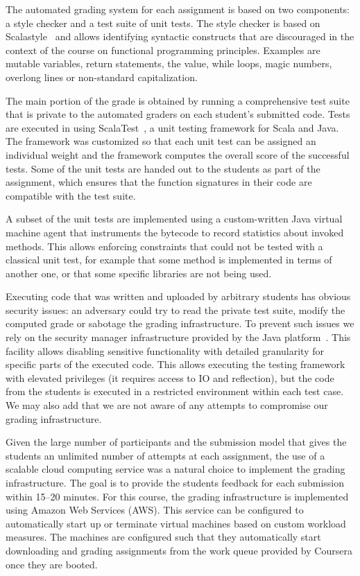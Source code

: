 \documentclass{sig-alternate}
\begin{document}
The automated grading system for each assignment is based on two components: a
style checker and a test suite of unit tests. The style checker is based on
Scalastyle~\cite{ScalaStyle} and allows identifying syntactic constructs that
are discouraged in the context of the course on functional programming principles.
Examples are mutable variables, return statements, the \lstinline@null@ value,
while loops, magic numbers, overlong lines or non-standard capitalization.

The main portion of the grade is obtained by running a comprehensive test suite
that is private to the automated graders on each student's submitted code.
Tests are executed in using ScalaTest~\cite{scalatest}, a unit testing framework
for Scala and Java. The framework was customized so that each unit test can be
assigned an individual weight and the framework computes the overall score of
the successful tests. Some of the unit tests are handed out to the students as
part of the assignment, which ensures that the function signatures in their code
are compatible with the test suite.

A subset of the unit tests are implemented using a custom-written Java virtual
machine agent \cite{vmagents} that instruments the bytecode to record statistics about
invoked methods. This allows enforcing constraints that could not be tested with a
classical unit test, for example that some method is implemented in terms of another
one, or that some specific libraries are not being used.

Executing code that was written and uploaded by arbitrary students has obvious
security issues: an adversary could try to read the private test suite, modify
the computed grade or sabotage the grading infrastructure. To prevent such issues
we rely on the security manager infrastructure provided by the Java platform~\cite{securityManager}.
This facility allows disabling sensitive functionality with detailed granularity
for specific parts of the executed code. This allows executing the testing framework
with elevated privileges (it requires access to IO and reflection), but the code
from the students is executed in a restricted environment within each test case.
We may also add that we are not aware of any attempts to compromise our grading
infrastructure.

Given the large number of participants and the submission model that gives the
students an unlimited number of attempts at each assignment, the use of a scalable
cloud computing service was a natural choice to implement the grading infrastructure.
The goal is to provide the students feedback for each submission within 15--20
minutes. For this course, the grading infrastructure is implemented using Amazon
Web Services (AWS). This service can be configured to automatically start up or
terminate virtual machines based on custom workload measures. The machines are
configured such that they automatically start downloading and grading assignments
from the work queue provided by Coursera once they are booted.
\end{document}
